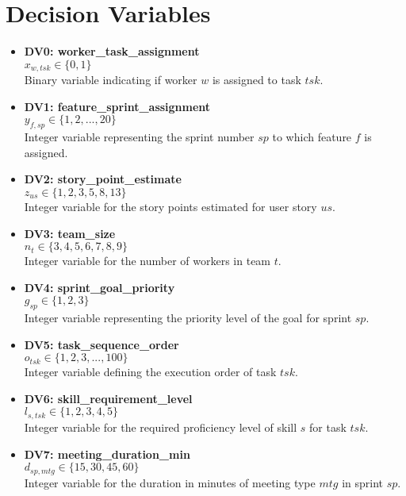 \documentclass[11pt]{article}
\begin{document}
\section{Decision Variables}
\begin{itemize}
    \item \textbf{DV0: worker\_task\_assignment} \\
    $x_{w, tsk} \in \{0, 1\}$ \\
    Binary variable indicating if worker $w$ is assigned to task $tsk$.

    \item \textbf{DV1: feature\_sprint\_assignment} \\
    $y_{f, sp} \in \{1, 2, ..., 20\}$ \\
    Integer variable representing the sprint number $sp$ to which feature $f$ is assigned.

    \item \textbf{DV2: story\_point\_estimate} \\
    $z_{us} \in \{1, 2, 3, 5, 8, 13\}$ \\
    Integer variable for the story points estimated for user story $us$.

    \item \textbf{DV3: team\_size} \\
    $n_t \in \{3, 4, 5, 6, 7, 8, 9\}$ \\
    Integer variable for the number of workers in team $t$.

    \item \textbf{DV4: sprint\_goal\_priority} \\
    $g_{sp} \in \{1, 2, 3\}$ \\
    Integer variable representing the priority level of the goal for sprint $sp$.

    \item \textbf{DV5: task\_sequence\_order} \\
    $o_{tsk} \in \{1, 2, 3, ..., 100\}$ \\
    Integer variable defining the execution order of task $tsk$.

    \item \textbf{DV6: skill\_requirement\_level} \\
    $l_{s, tsk} \in \{1, 2, 3, 4, 5\}$ \\
    Integer variable for the required proficiency level of skill $s$ for task $tsk$.

    \item \textbf{DV7: meeting\_duration\_min} \\
    $d_{sp, mtg} \in \{15, 30, 45, 60\}$ \\
    Integer variable for the duration in minutes of meeting type $mtg$ in sprint $sp$.


\end{itemize}
\end{document}
